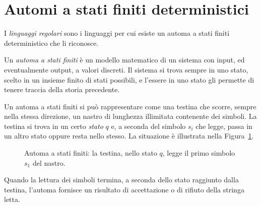 \documentclass[a4paper, 11pt, oneside]{book}
\theoremstyle{formale}
\begin{document}
    \section{Automi a stati finiti deterministici}
    I \emph{linguaggi regolari} sono i linguaggi per cui esiste un automa a stati finiti
    deterministico che li riconosce.

    Un \emph{automa a stati finiti} \`e un modello matematico di un sistema con input, ed
    eventualmente output, a valori discreti. Il sistema si trova sempre in uno stato, scelto
    in un insieme finito di stati possibili, e l'essere in uno stato gli permette di tenere
    traccia della storia precedente.

    Un automa a stati finiti si pu\`o rappresentare come una testina che scorre, sempre
    nella stessa direzione, un nastro di lunghezza illimitata contenente dei simboli. La
    testina si trova in un certo \emph{stato} $q$ e, a seconda del simbolo $s_i$ che legge,
    passa in un altro stato oppure resta nello stesso. La situazione \`e illustrata nella
    Figura~\ref{fig:nastro}.

    \begin{figure}[H]
        \centering
        \caption{Automa a stati finiti: la testina, nello stato $q$, legge il primo simbolo
            $s_1$ del nastro.}
        \label{fig:nastro}
    \end{figure}

    Quando la lettura dei simboli termina, a seconda dello stato raggiunto dalla testina,
    l'automa fornisce un risultato di accettazione o di rifiuto della stringa letta.
\end{document}
